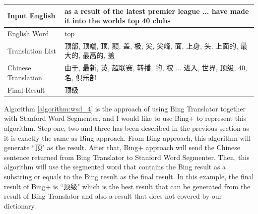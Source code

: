 \begin{CJK}{UTF8}{gbsn}
\begin{table}[ht]
\begin{center}
    \begin{tabular}{| p{2.5cm} | p{4cm} |}
        \hline
        Input English & as a result of the latest premier league ... have made it into the worlds top 40 clubs\\
        \hline
        English Word & top \\
        \hline
        Translation List & \parbox[t]{4cm}{顶部, 顶端, 顶, 颠, 盖, 极, 尖, 尖峰, 面, 上身, 头, 上面的, 最大的, 最高的, 盖}\\
        \hline
        Chinese Translation & 由于, 最新, 英, 超联赛, 转播, 的, 权 ... 进入, 世界, 顶级, 40, 名, 俱乐部\\
        \hline
        Final Result & 顶级\\
        \hline
    \end{tabular}
    \end{center}
\end{table}


Algorithm \ref{algorithm:wsd_4} is the approach of using Bing Translator together with Stanford Word Segmenter, and I would like to use Bing+ to represent this algorithm. Step one, two and three has been described in the previous section as it is exactly the same as Bing approach. From Bing approach, this algorithm will generate ``顶" as the result. After that, Bing+ approach will send the Chinese sentence returned from Bing Translator to Stanford Word Segmenter. Then, this algorithm will use the segmented word that contains the Bing result as a substring or equals to the Bing result as the final result. In this example, the final result of Bing+ is ``顶级" which is the best result that can be generated from the result of Bing Translator and also a result that does not covered by our dictionary.


\end{CJK}
